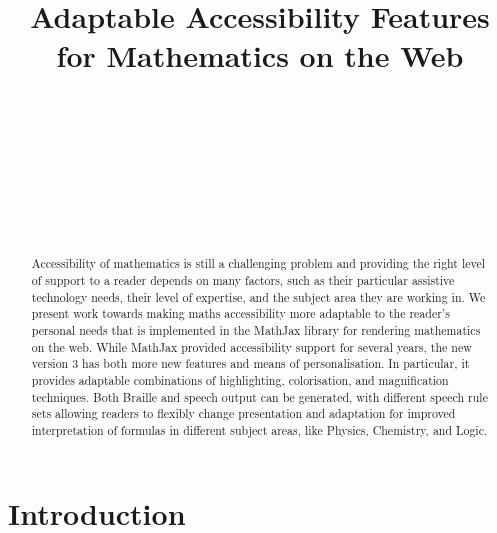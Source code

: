 \documentclass{sig-alternate}
\begin{document}


\title{Adaptable Accessibility Features for Mathematics on the Web}
  

\author{
  \\
  \\
  \\
  \\
  \\
  \\
  \\
}

\maketitle

\begin{abstract}
  Accessibility of mathematics is still a challenging problem and providing the
  right level of support to a reader depends on many factors, such as their
  particular assistive technology needs, their level of expertise, and the
  subject area they are working in. We present work towards making maths
  accessibility more adaptable to the reader's personal needs that is
  implemented in the MathJax library for rendering mathematics on the web. While
  MathJax provided accessibility support for several years, the new version 3
  has both more new features and means of personalisation. In particular, it
  provides adaptable combinations of highlighting, colorisation, and
  magnification techniques. Both Braille and speech output can be generated,
  with different speech rule sets allowing readers to flexibly change
  presentation and adaptation for improved interpretation of formulas in
  different subject areas, like Physics, Chemistry, and Logic.
\end{abstract}



\section{Introduction}
\end{document}
